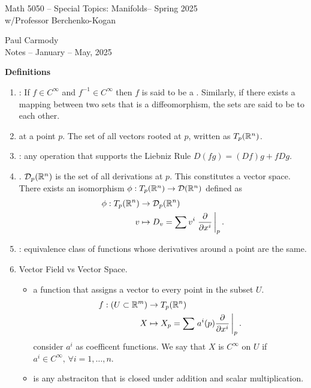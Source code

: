 \documentclass[10pt,a4paper]{report}
\newcommand{\CLASSNAME}{Math 5050 -- Special Topics: Manifolds}
\newcommand{\STUDENTNAME}{Paul Carmody}
\newcommand{\ASSIGNMENT}{Notes }
\newcommand{\DUEDATE}{January -- May, 2025}
\newcommand{\SEMESTER}{Spring 2025}
\begin{document}
\begin{center}
	\Large{\CLASSNAME -- \SEMESTER} \\
	\large{ w/Professor Berchenko-Kogan}
\end{center}
\begin{center}
	\STUDENTNAME \\
	\ASSIGNMENT -- \DUEDATE\\
\end{center} 

\noindent \textbf{Definitions}

\begin{enumerate}
	\item {}: If $f \in C^\infty$ and $f^{-1} \in C^\infty$ then $f$ is said to be a .  Similarly, if there exists a mapping between two sets that is a diffeomorphism, the sets are said to be  to each other.
	\item {} at a point $p$.  The set of all vectors rooted at $p$, written as $T_p(\mathbb{R}^n)$.  
	\item {}: any operation that supports the Liebniz Rule $D(fg) = (Df)g+fDg$.
	\item {}. $\mathcal{D}_p(\mathbb{R}^n)$ is the set of all derivations at $p$.  This constitutes a vector space.  There exists an isomorphism $\phi: T_p(\mathbb{R}^n) \to \mathcal{D}(\mathbb{R}^n)$ defined as
	\begin{align*}
		\phi: T_p(\mathbb{R}^n) &\to \mathcal{D}_p(\mathbb{R}^n)\\
		v &\mapsto D_v=\sum v^i \left . \frac{\partial }{\partial x^i} \, \right |_p.
	\end{align*}
	\item {}: equivalence class of functions whose derivatives around a point are the same.
	\item Vector Field vs Vector Space.  
	\begin{itemize}
		\item {} a function that assigns a vector to every point in the subset $U$. 
		\begin{align*}
			f: (U\subset \mathbb{R}^m) &\to T_p( \mathbb{R}^n) \\
				X &\mapsto X_p=\sum \left . a^i(p) \frac{\partial }{\partial x^i}  \, \right |_p.
		\end{align*}consider $a^i$ as coefficent functions.  We say that $X$ is $C^\infty$ on $U$ if $a^i\in C^\infty, \, \forall i=1,\dots,n$.
		\item {} is any abstraciton that is closed under addition and scalar multiplication.

\end{itemize}
\end{enumerate}
\end{document}
